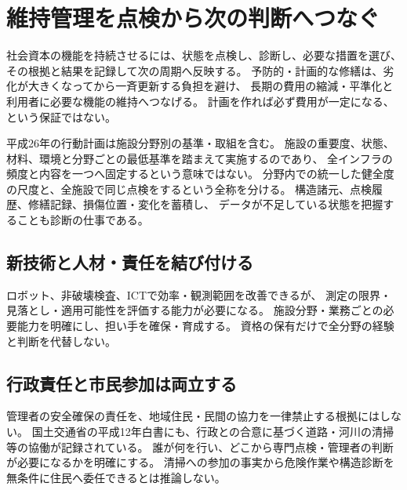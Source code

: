 \section{維持管理を点検から次の判断へつなぐ}\label{theory:safety:maintenance}
社会資本の機能を持続させるには、状態を点検し、診断し、必要な措置を選び、
その根拠と結果を記録して次の周期へ反映する。
予防的・計画的な修繕は、劣化が大きくなってから一斉更新する負担を避け、
長期の費用の縮減・平準化と利用者に必要な機能の維持へつなげる。
計画を作れば必ず費用が一定になる、という保証ではない。\cite{eng52_infra2014}

平成26年の行動計画は施設分野別の基準・取組を含む。
施設の重要度、状態、材料、環境と分野ごとの最低基準を踏まえて実施するのであり、
全インフラの頻度と内容を一つへ固定するという意味ではない。
分野内での統一した健全度の尺度と、全施設で同じ点検をするという全称を分ける。
構造諸元、点検履歴、修繕記録、損傷位置・変化を蓄積し、
データが不足している状態を把握することも診断の仕事である。

\subsection{新技術と人材・責任を結び付ける}
ロボット、非破壊検査、ICTで効率・観測範囲を改善できるが、
測定の限界・見落とし・適用可能性を評価する能力が必要になる。
施設分野・業務ごとの必要能力を明確にし、担い手を確保・育成する。
資格の保有だけで全分野の経験と判断を代替しない。\cite{eng52_infra2014}

\subsection{行政責任と市民参加は両立する}
管理者の安全確保の責任を、地域住民・民間の協力を一律禁止する根拠にはしない。
国土交通省の平成12年白書にも、行政との合意に基づく道路・河川の清掃等の協働が記録されている。
誰が何を行い、どこから専門点検・管理者の判断が必要になるかを明確にする。
清掃への参加の事実から危険作業や構造診断を無条件に住民へ委任できるとは推論しない。\cite{eng52_adopt}
